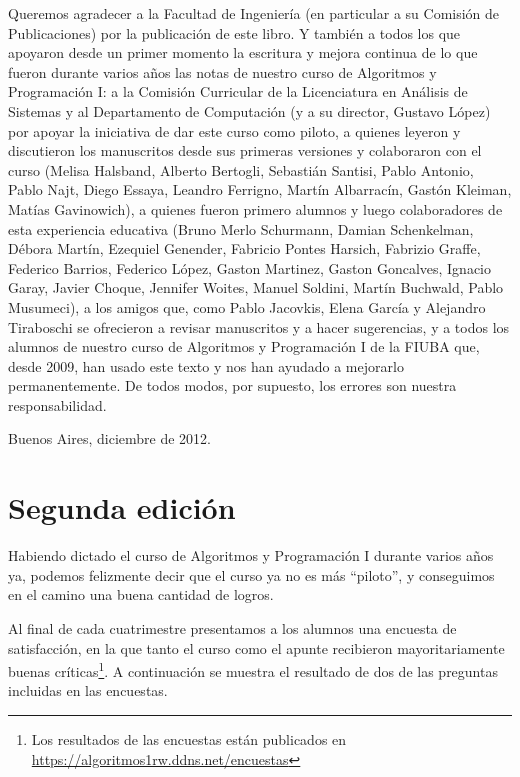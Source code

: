 Queremos agradecer a la Facultad de Ingeniería (en particular a su Comisión de Publicaciones)
por la publicación de este libro. Y también a todos los que apoyaron desde un primer momento
la escritura y mejora continua de lo que fueron durante varios años las notas de nuestro curso de
Algoritmos y Programación I: a la Comisión Curricular de la Licenciatura en Análisis de Sistemas y al
Departamento de Computación (y a su director, Gustavo López) por apoyar la iniciativa de dar este curso
como piloto, a quienes leyeron y discutieron los manuscritos desde sus primeras versiones y colaboraron
con el curso (Melisa Halsband, Alberto Bertogli, Sebastián Santisi, Pablo Antonio, Pablo Najt, Diego Essaya,
Leandro Ferrigno, Martín Albarracín, Gastón Kleiman, Matías Gavinowich), a quienes fueron primero alumnos y
luego colaboradores de esta experiencia educativa (Bruno Merlo Schurmann, Damian Schenkelman, Débora Martín,
Ezequiel Genender, Fabricio Pontes Harsich, Fabrizio Graffe, Federico Barrios, Federico López, Gaston
Martinez, Gaston Goncalves, Ignacio Garay, Javier Choque, Jennifer Woites, Manuel Soldini, Martín Buchwald,
Pablo Musumeci), a los amigos que, como Pablo Jacovkis, Elena García y Alejandro Tiraboschi se ofrecieron a
revisar manuscritos y a hacer sugerencias, y a todos los alumnos de nuestro curso de Algoritmos y
Programación I de la FIUBA que, desde 2009, han usado este texto y nos han ayudado a mejorarlo permanentemente.
De todos modos, por supuesto, los errores son nuestra responsabilidad.

\vspace{1cm}
\hfill Buenos Aires, diciembre de 2012.

\section*{Segunda edición}

Habiendo dictado el curso de Algoritmos y Programación I durante
varios años ya, podemos felizmente decir que el curso ya no es más \enquote{piloto},
y conseguimos en el camino una buena cantidad de logros.

Al final de cada cuatrimestre presentamos a los alumnos una encuesta de
satisfacción, en la que tanto el curso como el apunte recibieron
mayoritariamente buenas
críticas\footnote{Los resultados de las encuestas están publicados en
\url{https://algoritmos1rw.ddns.net/encuestas}}. A continuación se muestra el
resultado de dos de las preguntas incluidas en las encuestas.

